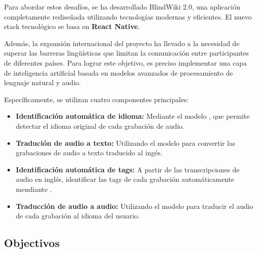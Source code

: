 Para abordar estos desafíos, se ha desarrollado BlindWiki 2.0, una aplicación completamente rediseñada utilizando tecnologías modernas y eficientes. El nuevo stack tecnológico se basa en \textbf{React Native}.

Además, la expansión internacional del proyecto ha llevado a la necesidad de superar las barreras lingüísticas que limitan la comunicación entre participantes de diferentes países. Para lograr este objetivo, es preciso implementar una capa de inteligencia artificial basada en modelos avanzados de procesamiento de lenguaje natural y audio. 

Específicamente, se utilizan cuatro componentes principales:
\begin{itemize}
    \item \textbf{Identificación automática de idioma:} Mediante el modelo \TODO, que permite detectar el idioma original de cada grabación de audio.
    \item \textbf{Tradución de audio a texto:} Utilizando el modelo \TODO para convertir las grabaciones de audio a texto traducido al ingés.
    \item \textbf{Identificación automática de tags:} A partir de las transcripciones de audio en inglés, identificar las tags de cada grabación automáticamente mendiante \TODO.
    \item \textbf{Traducción de audio a audio:} Utilizando el modelo \TODO para traducir el audio de cada grabación al idioma del usuario.
\end{itemize}

\subsection{Objectivos}